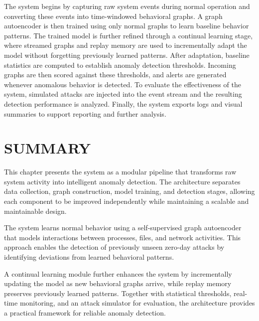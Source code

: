 The system begins by capturing raw system events during normal operation and converting these events into time-windowed behavioral graphs. A graph autoencoder is then trained using only normal graphs to learn baseline behavior patterns. The trained model is further refined through a continual learning stage, where streamed graphs and replay memory are used to incrementally adapt the model without forgetting previously learned patterns. After adaptation, baseline statistics are computed to establish anomaly detection thresholds. Incoming graphs are then scored against these thresholds, and alerts are generated whenever anomalous behavior is detected. To evaluate the effectiveness of the system, simulated attacks are injected into the event stream and the resulting detection performance is analyzed. Finally, the system exports logs and visual summaries to support reporting and further analysis.

\setlength{\parskip}{12pt}
\setlength{\parindent}{0pt}

\section{SUMMARY}

This chapter presents the system as a modular pipeline that transforms raw
system activity into intelligent anomaly detection. The architecture separates
data collection, graph construction, model training, and detection stages,
allowing each component to be improved independently while maintaining a
scalable and maintainable design.

The system learns normal behavior using a self-supervised graph autoencoder
that models interactions between processes, files, and network activities.
This approach enables the detection of previously unseen zero-day attacks by
identifying deviations from learned behavioral patterns.

A continual learning module further enhances the system by incrementally
updating the model as new behavioral graphs arrive, while replay memory
preserves previously learned patterns. Together with statistical thresholds,
real-time monitoring, and an attack simulator for evaluation, the architecture
provides a practical framework for reliable anomaly detection.